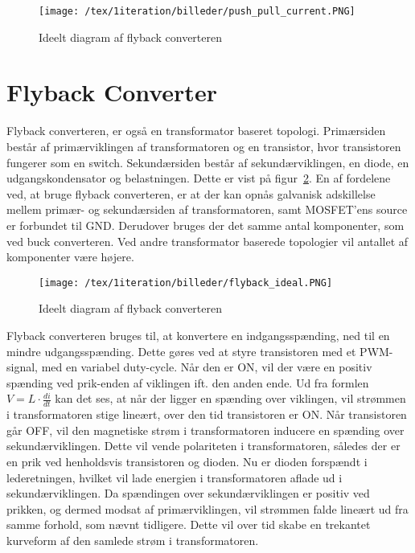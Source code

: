 \begin{figure}[H]
	\center
	\texttt{[image: /tex/1iteration/billeder/push\_pull\_current.PNG]}
	\caption{Ideelt diagram af flyback converteren
		\cite{SMPS-topologies}}
	\label{fig:push_pull_current}
\end{figure} 

\section{Flyback Converter}
Flyback converteren, er også en transformator baseret topologi. Primærsiden består af primærviklingen af transformatoren og en transistor, hvor transistoren fungerer som en switch. Sekundærsiden består af sekundærviklingen, en diode, en udgangskondensator og belastningen. Dette er vist på figur~\ref{fig:flyback_ideal}. En af fordelene ved, at bruge flyback converteren, er at der kan opnås galvanisk adskillelse mellem primær- og sekundærsiden af transformatoren, samt MOSFET'ens source er forbundet til GND. Derudover bruges der det samme antal komponenter, som ved buck converteren. Ved andre transformator baserede topologier vil antallet af komponenter være højere. 

\begin{figure}[H]
	\center
	\texttt{[image: /tex/1iteration/billeder/flyback\_ideal.PNG]}
	\caption{Ideelt diagram af flyback converteren
	\cite{SMPS-topologies}}
	\label{fig:flyback_ideal}
\end{figure} 

\noindent Flyback converteren bruges til, at konvertere en indgangsspænding, ned til en mindre udgangsspænding. Dette gøres ved at styre transistoren med et PWM-signal, med en variabel duty-cycle. Når den er ON, vil der være en positiv spænding ved prik-enden af viklingen ift. den anden ende. Ud fra formlen $V=L\cdot \frac{di}{dt}$ kan det ses, at når der ligger en spænding over viklingen, vil strømmen i transformatoren stige lineært, over den tid transistoren er ON. Når transistoren går OFF, vil den magnetiske strøm i transformatoren inducere en spænding over sekundærviklingen. Dette vil vende polariteten i transformatoren, således der er en prik ved henholdsvis transistoren og dioden. Nu er dioden forspændt i lederetningen, hvilket vil lade energien i transformatoren aflade ud i sekundærviklingen. Da spændingen over sekundærviklingen er positiv ved prikken, og dermed modsat af primærviklingen, vil strømmen falde lineært ud fra samme forhold, som nævnt tidligere. Dette vil over tid skabe en trekantet kurveform af den samlede strøm i transformatoren. 

